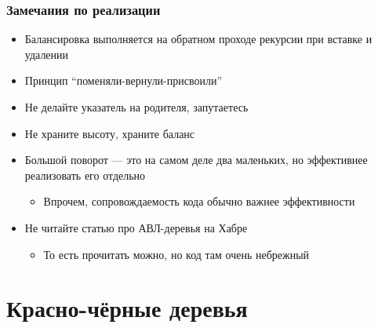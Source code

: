 \documentclass{../../slides-style}
\begin{document}
    \begin{frame}
        \frametitle{Замечания по реализации}
        \begin{itemize}
            \item Балансировка выполняется на обратном проходе рекурсии при вставке и удалении
            \item Принцип ``поменяли-вернули-присвоили''
            \item Не делайте указатель на родителя, запутаетесь
            \item Не храните высоту, храните баланс
            \item Большой поворот --- это на самом деле два маленьких, но эффективнее реализовать его отдельно
            \begin{itemize}
                \item Впрочем, сопровождаемость кода обычно важнее эффективности
            \end{itemize}
            \item Не читайте статью про АВЛ-деревья на Хабре
            \begin{itemize}
                \item То есть прочитать можно, но код там очень небрежный
            \end{itemize}
        \end{itemize}
    \end{frame}

    \section{Красно-чёрные деревья}
\end{document}
